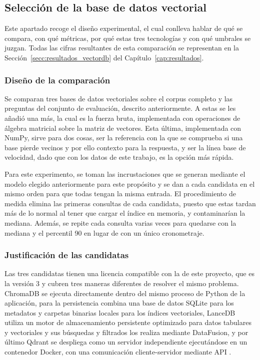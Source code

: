 \subsection[Selección de la base de datos vectorial]{Selección de la base de datos vectorial}
\label{secc:fase2_vectordb}

Este apartado recoge el diseño experimental, el cual conlleva hablar de qué se compara, con qué métricas, por qué estas tres tecnologías y con qué umbrales se juzgan. Todas las cifras resultantes de esta comparación se representan en la Sección~\ref{secc:resultados_vectordb} del Capítulo~\ref{cap:resultados}.


\subsubsection[Diseño de la comparación]{Diseño de la comparación}

Se comparan tres bases de datos vectoriales sobre el corpus completo y las preguntas del conjunto de evaluación, descrito anteriormente. A estas se les añadió una más, la cual es la fuerza bruta, implementada con operaciones de álgebra matricial sobre la matriz de vectores. Esta última, implementada con NumPy, sirve para dos cosas, ser la referencia con la que se comprueba si una base pierde vecinos y por ello contexto para la respuesta, y ser la línea base de velocidad, dado que con los datos de este trabajo, es la opción más rápida.

Para este experimento, se toman las incrustaciones que se generan mediante el modelo elegido anteriormente para este propósito y se dan a cada candidata en el mismo orden para que todas tengan la misma entrada. El procedimiento de medida elimina las primeras consultas de cada candidata, puesto que estas tardan más de lo normal al tener que cargar el índice en memoria, y contaminarían la mediana. Además, se repite cada consulta varias veces para quedarse con la mediana y el percentil 90 en lugar de con un único cronometraje.

\subsubsection[Justificación de las candidatas]{Justificación de las candidatas}

Las tres candidatas tienen una licencia compatible con la de este proyecto, que es la  versión 3\cite{gpl3} y cubren tres maneras diferentes de resolver el mismo problema. ChromaDB se ejecuta directamente dentro del mismo proceso de Python de la aplicación, para la persistencia combina una base de datos SQLite para los metadatos y carpetas binarias locales para los índices vectoriales, LanceDB utiliza un motor de almacenamiento persistente optimizado para datos tabulares y vectoriales y sus búsquedas y filtrados los realiza mediante DataFusion, y por último Qdrant se despliega como un servidor independiente ejecutándose en un contenedor Docker, con una comunicación cliente-servidor mediante API .

